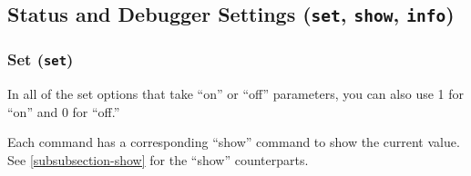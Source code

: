 \subsection{Status and Debugger Settings ({\tt set}, {\tt show}, {\tt info})\label{subsection-status}}

\subsubsection{Set ({\tt set})\label{subsubsection-set}}

In all of the set options that take ``on'' or ``off'' parameters, you
can also use 1 for ``on'' and 0 for ``off.''

Each command has a corresponding ``show'' command to show the current
value. See \ref{subsubsection-show} for the ``show'' counterparts.


